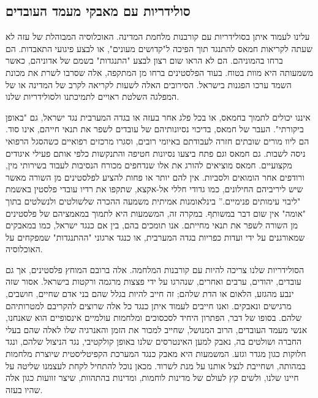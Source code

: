 \subsection{סולידריות עם מאבקי מעמד העובדים}

עלינו לעמוד איתן בסולידריות עם קורבנות מלחמת המדינה. האוכלוסיה המבוהלת של עזה לא שעתה לקריאות חמאס להתנגד תוך הפיכה ל"קדושים מעונים", או לבצע פיגועי התאבדות. הם ברחו בהמוניהם. הם לא הראו שום רצון לבצע "התנגדות" בשמם של אדוניהם, כאשר משמעותה היא מוות בטוח. בעוד הפלסטינים ברחו מן המתקפה, אלה שסרבו לשרת את מכונת השמד ערכו הפגנות בישראל. הסירובים האלה לשעות לקריאה לקרב של המדינה או של המפלגה השלטת ראויים לתמיכתנו ולסולידריות שלנו.

איננו יכולים לתמוך בחמאס, או בכל פלג אחר בעזה או בגדה המערבית נגד ישראל, גם "באופן ביקורתי". העבר של חמאס, בדיכוי נסיונותיהם של עובדים לשפר את תנאי חייהם, אינו סוד. הם ליוו מורים שובתים חזרה לעבודתם באיומי רובים, וסגרו מרכזים רפואיים כשהסגל הרפואי ניסה לשבות. גם חמאס וגם פתח ביצעו נסיונות חטיפה והתנקשות כלפי אותם פעילי איגודים מקצועיים. חמאס מוציאים להורג את אלו שנדחפים מכורח הנסיבות לעבוד בשירותי מין, ורודפים אחר הומואים ולסביות. אין להם יותר או פחות להציע לפלסטינים מן השורה מאשר שיש ליריביהם החילונים, כמו גדודי חללי אל-אקצא, שתקפו את רדיו עובדי פלסטין באשמת "ליבוי עימותים פנימיים.” בינלאומנות אמיתית משמעה ההכרה שלשולטים ולנשלטים בתוך "אומה" אין שום דבר במשותף. במקרה זה, המשמעות היא לתמוך במאמציהם של פלסטינים מן השורה לשפר את תנאי מחייתם. אנו תומכים בהם, בין אם כנגד ישראל, כמו במאבקים שמאורגנים על ידי ועדות כפריות בגדה המערבית, או כנגד ארגוני "ההתנגדות" שמפקחים על האוכלוסיה.

הסולידריות שלנו צריכה להיות עם קורבנות המלחמה. אלה ברובם המוחץ פלסטינים, אך גם עובדים, יהודים, ערבים ואחרים, שנהרגו על ידי פצצות מרגמה ורקטות בישראל. אסור שזה ינבע מהגזע, הלאום או הדת שלהם; זה חייב להיות בגלל שהם בני אדם שחיים, חושבים, מרגישים ונאבקים. ואנו חייבים לעמוד איתן כנגד כל אלה שרוצים להקריבם למטרותיהם שלהם. בסופו של דבר, הפתרון היחיד לסכסוכים ומלחמות עולמיים אינסופיים הוא שאנחנו, אנשי מעמד העובדים, הרוב המנושל, שחייב למכור את הזמן והאנרגיה שלו לאלה שהם בעלי החברה ושולטים בה, נאבק למען האינטרסים שלנו באופן קולקטיבי, נגד הניצול שלהם, ונגד חלוקות כגון מגדר וגזע. המשמעות היא מאבק כנגד המערכת הקפיטליסטית שיוצרת מלחמות במהותה, ושחייבת לנצל אותנו על מנת לשרוד. מכאן נוכל להתחיל לקחת לעצמנו שליטה על חיינו שלנו, ולשים קץ לעולם של מדינות לוחמות, ומדינות בהתהוות, שיצר זוועות כגון אלה שהיו בעזה.
